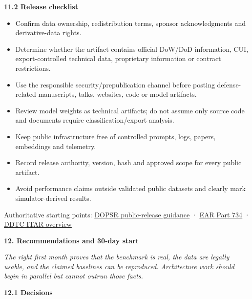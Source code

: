 \documentclass[
]{article}
\begin{document}
\textbf{11.2 Release checklist}

\begin{itemize}
\item
  Confirm data ownership, redistribution terms, sponsor acknowledgments
  and derivative-data rights.
\item
  Determine whether the artifact contains official DoW/DoD information,
  CUI, export-controlled technical data, proprietary information or
  contract restrictions.
\item
  Use the responsible security/prepublication channel before posting
  defense-related manuscripts, talks, websites, code or model artifacts.
\item
  Review model weights as technical artifacts; do not assume only source
  code and documents require classification/export analysis.
\item
  Keep public infrastructure free of controlled prompts, logs, papers,
  embeddings and telemetry.
\item
  Record release authority, version, hash and approved scope for every
  public artifact.
\item
  Avoid performance claims outside validated public datasets and clearly
  mark simulator-derived results.
\end{itemize}

Authoritative starting points:
\href{https://www.esd.whs.mil/Records-Declass/Security-Review/PrePublication-and-Manuscripts/}{\ul{DOPSR
public-release guidance}} ·
\href{https://www.bis.gov/regulations/ear/734}{\ul{EAR Part 734}} ·
\href{https://www.pmddtc.state.gov/ddtc_public?id=ddtc_public_portal_itar_landing}{\ul{DDTC
ITAR overview}}

\textbf{12. Recommendations and 30-day start}

\emph{The right first month proves that the benchmark is real, the data
are legally usable, and the claimed baselines can be reproduced.
Architecture work should begin in parallel but cannot outrun those
facts.}

\textbf{12.1 Decisions}
\end{document}
